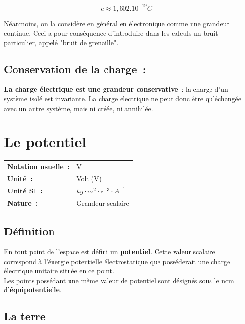 \begin{equation}
	e \approx 1,602.10^{-19} C
\end{equation}

Néanmoins, on la considère en général en électronique comme une grandeur continue. Ceci a pour conséquence d'introduire dans les calculs un bruit particulier, appelé "bruit de grenaille".

\subsection*{ Conservation de la charge~: }

\textbf{La charge électrique est une grandeur conservative}~: la charge d'un système isolé est invariante. La charge electrique ne peut donc être qu'échangée avec un autre système, mais ni créée, ni annihilée.

\section{Le potentiel}

\begin{tabular}{ll}
\textbf{Notation usuelle~:} & V \\
\textbf{Unité~:} & Volt (V)\\
\textbf{Unité SI~:} & ${kg} \cdot m^2 \cdot {s}^{-3} \cdot A^{-1}$ \\
\textbf{Nature~:} & Grandeur scalaire \\ 
\end{tabular}

\subsection*{Définition}

En tout point de l'espace est défini un \textbf{potentiel}. Cette valeur scalaire correspond à l'énergie potentielle électrostatique que posséderait une charge électrique unitaire située en ce point. \\ 

Les points possédant une même valeur de potentiel sont désignés sous le nom d'\textbf{équipotentielle}.

\subsection*{La terre}

